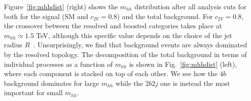 Figure~\ref{fig:mhhdist} (right) shows the $m_{hh}$ distribution
after all analysis cuts for both
for the signal (SM and $c_{2V}=0.8$) and the total background.
%
For $c_{2V}=0.8$, the crossover between the resolved and
boosted categories takes place
at $m_{hh}\simeq 1.5$ TeV,
although this specific value depends on the choice of the jet
radius $R$~\cite{Gouzevitch:2013qca}.
%
Unsurprisingly, we find that
background events are always dominated by the resolved topology.
%
The decomposition of the total background in terms of individual processes as a
function of $m_{hh}$ is shown in Fig.~\ref{fig:mhhdist} (left),
where each component is
stacked on top of each other. We see how the $4b$ background dominates
for large $m_{hh}$ while the $2b2j$ one is instead the most important for small
$m_{hh}$. 

